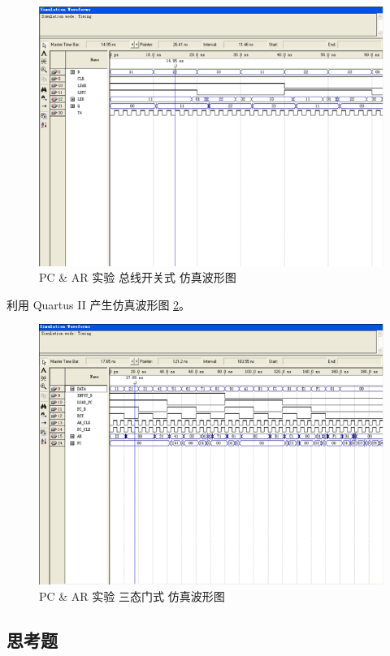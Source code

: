 \begin{figure}[H]
\centering
\includegraphics[width=\textwidth]{images/wave4_1.png}
\caption{PC \& AR 实验 总线开关式 仿真波形图}
\label{fig:wave4_1}
\end{figure}

利用 Quartus II 产生仿真波形图 \ref{fig:wave4_2}。

\begin{figure}[H]
\centering
\includegraphics[width=\textwidth]{images/wave4_2.png}
\caption{PC \& AR 实验 三态门式 仿真波形图}
\label{fig:wave4_2}
\end{figure}


\subsection{思考题}

